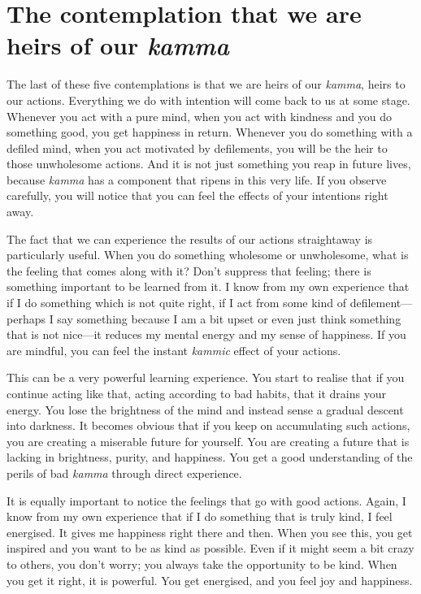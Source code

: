 \documentclass[12pt,openany]{book}
\begin{document}
\section*{The contemplation that we are heirs of our \textit{kamma}}

The last of these five contemplations is that we are heirs of our \textit{kamma}, heirs to our actions. Everything we do with intention will come back to us at some stage. Whenever you act with a pure mind, when you act with kindness and you do something good, you get happiness in return. Whenever you do something with a defiled mind, when you act motivated by defilements, you will be the heir to those unwholesome actions. And it is not just something you reap in future lives, because \textit{kamma} has a component that ripens in this very life. If you observe carefully, you will notice that you can feel the effects of your intentions right away.

The fact that we can experience the results of our actions straightaway is particularly useful. When you do something wholesome or unwholesome, what is the feeling that comes along with it? Don’t suppress that feeling; there is something important to be learned from it. I know from my own experience that if I do something which is not quite right, if I act from some kind of defilement—perhaps I say something because I am a bit upset or even just think something that is not nice—it reduces my mental energy and my sense of happiness. If you are mindful, you can feel the instant \textit{kammic} effect of your actions.

This can be a very powerful learning experience. You start to realise that if you continue acting like that, acting according to bad habits, that it drains your energy. You lose the brightness of the mind and instead sense a gradual descent into darkness. It becomes obvious that if you keep on accumulating such actions, you are creating a miserable future for yourself. You are creating a future that is lacking in brightness, purity, and happiness. You get a good understanding of the perils of bad \textit{kamma} through direct experience.

It is equally important to notice the feelings that go with good actions. Again, I know from my own experience that if I do something that is truly kind, I feel energised. It gives me happiness right there and then. When you see this, you get inspired and you want to be as kind as possible. Even if it might seem a bit crazy to others, you don’t worry; you always take the opportunity to be kind. When you get it right, it is powerful. You get energised, and you feel joy and happiness.
\end{document}
